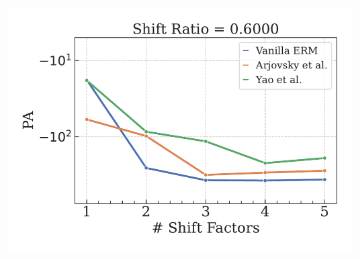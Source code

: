 \begin{figure}[H]
\begin{subfigure}[b]{0.3\textwidth}
    \end{subfigure}
    \hfill
    \begin{subfigure}[b]{0.3\textwidth}
        \centering
        \includegraphics[width=\textwidth]{img/results_discussion/datashift/shift_ratio=0.600.pdf}
    \end{subfigure}

    \vspace{1em}


\end{figure}
